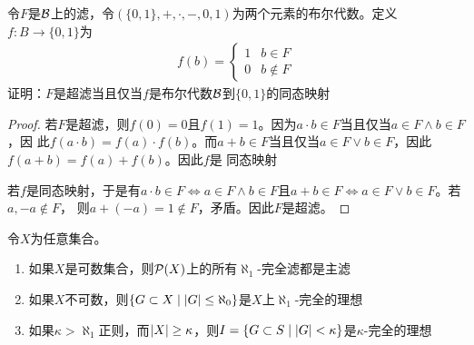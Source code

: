 \documentclass[11pt]{article}
\begin{document}
\begin{exercise}[3.2.19]
令\(F\)是\(\mathcal{B}\)上的滤，令\((\{0,1\},+,\cdot,-,0,1)\)为两个元素的布尔代数。定义\(f:B\to\{0,1\}\)为
\begin{align*}
f(b)=
\begin{cases}
1&b\in F\\
0&b\notin F
\end{cases}
\end{align*}
证明：\(F\)是超滤当且仅当\(f\)是布尔代数\(\mathcal{B}\)到\(\{0,1\}\)的同态映射
\end{exercise}

\begin{proof}
若\(F\)是超滤，则\(f(0)=0\)且\(f(1)=1\)。因为\(a\cdot b\in F\)当且仅当\(a\in F\wedge b\in F\)，因
此\(f(a\cdot b)=f(a)\cdot f(b)\)。而\(a+b\in F\)当且仅当\(a\in F\vee b\in F\)，因此\(f(a+b)=f(a)+f(b)\)。因此\(f\)是
同态映射

若\(f\)是同态映射，于是有\(a\cdot b\in F\Leftrightarrow a\in F\wedge b\in F\)且\(a+b\in F\Leftrightarrow a\in F\vee b\in F\)。若\(a,-a\notin F\)，
则\(a+(-a)=1\notin F\)，矛盾。因此\(F\)是超滤。
\end{proof}

\begin{exercise}[3.2.33]
令\(X\)为任意集合。
\begin{enumerate}
\item 如果\(X\)是可数集合，则\(\mathcal{P}(X)\)上的所有\(\aleph_1\)-完全滤都是主滤
\item 如果\(X\)不可数，则\(\{G\subset X\mid\abs{G}\le\aleph_0\}\)是\(X\)上\(\aleph_1\)-完全的理想
\item 如果\(\kappa>\aleph_1\)正则，而\(\abs{X}\ge\kappa\)，则\(I=\{G\subset S\mid\abs{G}<\kappa\}\)是\(\kappa\)-完全的理想
\end{enumerate}
\end{exercise}
\end{document}
